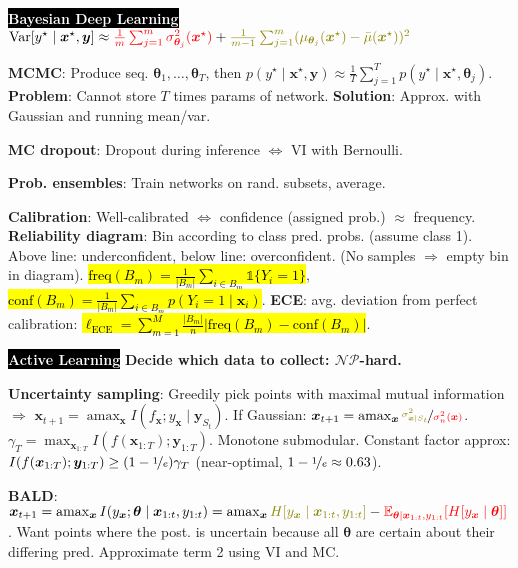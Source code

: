 \documentclass{article}
\DeclareRobustCommand{\hlal}[1]{{\textcolor{red}{#1}}}
\DeclareRobustCommand{\hlep}[1]{{\textcolor{olive}{#1}}}
\DeclareRobustCommand{\hleq}[1]{{\sethlcolor{pink} \hl{#1}}}
\DeclareMathOperator*{\argmax}{amax}
\newcommand{\E}{\mathbb{E}}
\newenvironment{topic}[1]
{\textbf{\sffamily  \colorbox{black}{\textcolor{white}{#1}}}}
{}
\begin{document}
\begin{multicols*}{3}
\begin{topic}{Bayesian Deep Learning}
    $\mathrm{Var}[y^\star\mid\bm{x}^\star,\bm{y}] \approx
    \text{\hlal{$\frac{1}{m}\sum_{j=1}^m \sigma^2_{\bm{\theta}_j}(\bm{x}^\star)$}} +
    \text{\hlep{$\frac{1}{m-1} \sum_{j=1}^m (\mu_{\bm{\theta}_j}(\bm{x}^\star) -
    \bar{\mu}(\bm{x}^\star))^2$}}$

    \textbf{MCMC}: Produce seq. $\bm{\theta}_1,\ldots,\bm{\theta}_T$, then
    $p(y^\star\mid\bm{x}^\star,\bm{y}) \approx \frac{1}{T} \sum_{j=1}^T
    p(y^\star\mid\bm{x}^\star,\bm{\theta}_j)$. \textbf{Problem}: Cannot store
    $T$ times params of network. \textbf{Solution}: Approx. with Gaussian
    and running mean/var.

    \textbf{MC dropout}: Dropout during inference $\Leftrightarrow$ VI with
    Bernoulli.

    \textbf{Prob. ensembles}: Train networks on rand. subsets, average.

    \textbf{Calibration}: Well-calibrated $\Leftrightarrow$ confidence
    (assigned prob.) $\approx$ frequency. \textbf{Reliability diagram}: Bin
    according to class pred. probs. (assume class 1). Above line:
    underconfident, below line: overconfident. (No samples $\Rightarrow$ empty
    bin in diagram). \hleq{$\text{freq}(B_m) = \frac{1}{|B_m|} \sum_{i\in B_m}
    \mathbb{1}\{Y_i=1\}$}, \hleq{$\text{conf}(B_m) = \frac{1}{|B_m|} \sum_{i\in B_m}
    p(Y_i=1\mid \bm{x}_i)$}. \textbf{ECE}: avg. deviation from perfect
    calibration: \hleq{$\ell_{\text{ECE}} = \sum_{m=1}^M \frac{|B_m|}{n}
    |\text{freq}(B_m) - \text{conf}(B_m)|$}.
  \end{topic}

  \begin{topic}{Active Learning}
    \textbf{Decide which data to collect: $\mathcal{NP}$-hard.}

    \textbf{Uncertainty sampling}: Greedily pick points with maximal mutual
    information $\Rightarrow$ $\bm{x}_{t+1} = \argmax_{\bm{x}}
    I(f_{\bm{x}};y_{\bm{x}}\mid \bm{y}_{S_t})$. If Gaussian:
    $\bm{x}_{t+1}=\argmax_{\bm{x}} \nicefrac{\text{\hlep{$\sigma^2_{\bm{x}\mid
    S_t}$}}}{\text{\hlal{$\sigma_n^2(\bm{x})$}}}$. $\gamma_T =
    \max_{\bm{x}_{1:T}} I(f(\bm{x}_{1:T});\bm{y}_{1:T})$. Monotone submodular.
    Constant factor approx: $I(f(\bm{x}_{1:T});\bm{y}_{1:T}) \geq (1-
    \nicefrac{1}{e}) \gamma_T$ (near-optimal, $1-\nicefrac{1}{e} \approx
    0.63$).

    \textbf{BALD}: $\bm{x}_{t+1} = \argmax_{\bm{x}}
    I(y_{\bm{x}};\bm{\theta}\mid\bm{x}_{1:t}, y_{1:t}) = \argmax_{\bm{x}}
    \text{\hlep{$H[y_{\bm{x}}\mid\bm{x}_{1:t},y_{1:t}]$}} -
    \text{\hlal{$\E_{\bm{\theta}\mid\bm{x}_{1:t},y_{1:t}}[H[y_{\bm{x}} \mid
    \bm{\theta}]]$}}$. Want points where the post. is uncertain because all
    $\bm{\theta}$ are certain about their differing pred. Approximate term 2
    using VI and MC.
  \end{topic}


\end{multicols*}
\end{document}

